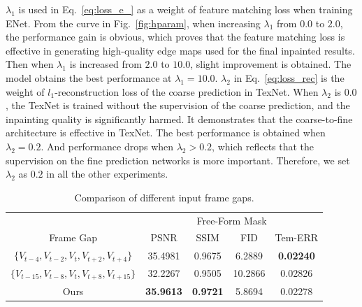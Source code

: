 $\lambda_1$ is used in Eq.~\eqref{eq:loss_e_} as a weight of feature matching loss when training ENet. %
From the curve in Fig.~\ref{fig:hparam}, when increasing $\lambda_1$ from $0.0$ to $2.0$, the performance gain is obvious, which proves that the feature matching loss is effective in
generating high-quality edge maps used for the final inpainted results. 
Then when $\lambda_1$ is increased from $2.0$ to $10.0$, slight improvement is obtained.
The model obtains the best performance at $\lambda_1=10.0$.
%
$\lambda_2$ in Eq.~\eqref{eq:loss_rec} is the weight of $l_1$-reconstruction loss of the coarse prediction in TexNet. 
When $\lambda_2$ is $0.0$, the TexNet is trained without the supervision of the coarse prediction, and the inpainting quality is significantly harmed.
It demonstrates that the coarse-to-fine architecture is effective in TexNet. The best performance is obtained when $\lambda_2=0.2$. And performance drops when $\lambda_2>0.2$, which reflects that the supervision on the fine prediction networks is more important.
Therefore, we set $\lambda_2$ as $0.2$ in all the other experiments.




\begin{table}[t]
	\caption{Comparison of different input frame gaps. }\smallskip
	\scriptsize
	\centering
	{
		\smallskip\begin{tabular}{c|c|c|c|c}
			\hline
			&\multicolumn{4}{c}{Free-Form Mask}  \\
			\cline{1-5} 
			Frame Gap& PSNR & SSIM & FID & Tem-ERR \\
			
			\hline
			$\{V_{t-4},V_{t-2},V_{t},V_{t+2},V_{t+4}\}$ 
			& 35.4981 & 0.9675 & 6.2889 &\textbf{0.02240} 
			\\ \hline
			$\{V_{t-15},V_{t-8},V_{t},V_{t+8},V_{t+15}\}$ & 32.2267 & 0.9505 &  10.2866 &0.02826
			\\ \hline
			Ours &\textbf{35.9613} & \textbf{0.9721}&  5.8694 &  0.02278 \\
		
			\hline
			
			
		\end{tabular}
	}
	\label{tab:input-gap}
\end{table}

